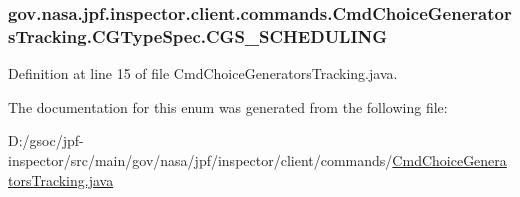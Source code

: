 \subsubsection[{\texorpdfstring{C\+G\+S\+\_\+\+S\+C\+H\+E\+D\+U\+L\+I\+NG}{CGS_SCHEDULING}}]{\setlength{\rightskip}{0pt plus 5cm}gov.\+nasa.\+jpf.\+inspector.\+client.\+commands.\+Cmd\+Choice\+Generators\+Tracking.\+C\+G\+Type\+Spec.\+C\+G\+S\+\_\+\+S\+C\+H\+E\+D\+U\+L\+I\+NG}\hypertarget{enumgov_1_1nasa_1_1jpf_1_1inspector_1_1client_1_1commands_1_1_cmd_choice_generators_tracking_1_1_c_g_type_spec_a2da4a867a8c86c91b44b4eab39778d57}{}\label{enumgov_1_1nasa_1_1jpf_1_1inspector_1_1client_1_1commands_1_1_cmd_choice_generators_tracking_1_1_c_g_type_spec_a2da4a867a8c86c91b44b4eab39778d57}


Definition at line 15 of file Cmd\+Choice\+Generators\+Tracking.\+java.



The documentation for this enum was generated from the following file\+:\begin{DoxyCompactItemize}
\item 
D\+:/gsoc/jpf-\/inspector/src/main/gov/nasa/jpf/inspector/client/commands/\hyperlink{_cmd_choice_generators_tracking_8java}{Cmd\+Choice\+Generators\+Tracking.\+java}\end{DoxyCompactItemize}
